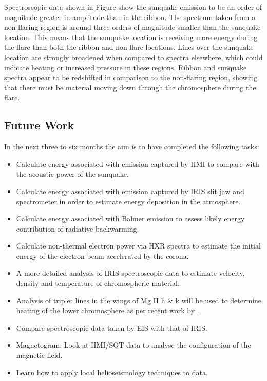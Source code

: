 Spectroscopic data shown in Figure show the sunquake emission to be an order of magnitude greater in amplitude than in the ribbon. The spectrum taken from a non-flaring region is around three orders of magnitude smaller than the sunquake location. This means that the sunquake location is receiving more energy during the flare than both the ribbon and non-flare locations. Lines over the sunquake location are strongly broadened when compared to spectra elsewhere, which could indicate heating or increased pressure in these regions. Ribbon and sunquake spectra appear to be redshifted in comparison to the non-flaring region, showing that there must be material moving down through the chromosphere during the flare.\\




\subsection{Future Work}
In the next three to six months the aim is to have completed the following tasks:
\begin{itemize}

\item Calculate energy associated with emission captured by HMI to compare with the acoustic power of the sunquake.

\item Calculate energy associated with emission captured by IRIS slit jaw and spectrometer in order to estimate energy deposition in the atmosphere.

\item Calculate energy associated with Balmer emission to assess likely energy contribution of radiative backwarming.

\item Calculate non-thermal electron power via HXR spectra to estimate the initial energy of the electron beam accelerated by the corona.


\item A more detailed analysis of IRIS spectroscopic data to estimate velocity, density and temperature of chromospheric material.

\item Analysis of triplet lines in the wings of Mg II h \& k will be used to determine heating of the lower chromosphere as per recent work by \cite{2015arXiv150401733P}.

\item Compare spectroscopic data taken by EIS with that of IRIS.

\item Magnetogram: Look at HMI/SOT data to analyse the configuration of the magnetic field.

\item Learn how to apply local helioseismology techniques to data.

\end{itemize}

